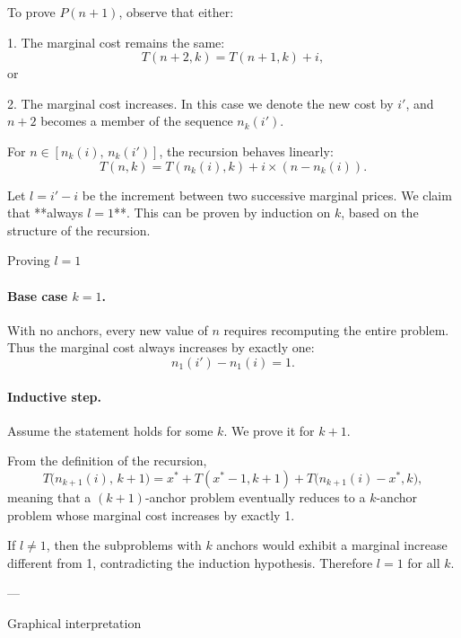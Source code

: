 \documentclass[a4paper,10pt]{article}
\begin{document}
To prove \(P(n+1)\), observe that either:

1. The marginal cost remains the same:
   \[
   T(n+2,k) = T(n+1,k) + i,
   \]
   or

2. The marginal cost increases.  
   In this case we denote the new cost by \(i'\), and \(n+2\) becomes a member of the sequence \(n_k(i')\).

For \(n \in [n_k(i),\, n_k(i')]\), the recursion behaves linearly:
\[
T(n,k) = T(n_k(i),k) + i \times (n - n_k(i)).
\]

Let \(l = i' - i\) be the increment between two successive marginal prices.  
We claim that **always \(l = 1\)**.  
This can be proven by induction on \(k\), based on the structure of the recursion.

Proving \(l = 1\)

\paragraph*{Base case \(k = 1\).}
With no anchors, every new value of \(n\) requires recomputing the entire problem.  
Thus the marginal cost always increases by exactly one:
\[
n_1(i') - n_1(i) = 1.
\]

\paragraph*{Inductive step.}
Assume the statement holds for some \(k\).  
We prove it for \(k+1\).

From the definition of the recursion,
\[
T\bigl(n_{k+1}(i),\, k+1\bigr)
  = x^* + T(x^*-1,k+1) + T\bigl(n_{k+1}(i)-x^*,k\bigr),
\]
meaning that a \((k+1)\)-anchor problem eventually reduces to a \(k\)-anchor problem whose marginal cost increases by exactly 1.

If \(l \ne 1\), then the subproblems with \(k\) anchors would exhibit a marginal increase different from 1, contradicting the induction hypothesis.  
Therefore \(l = 1\) for all \(k\).

---

 Graphical interpretation
\end{document}
